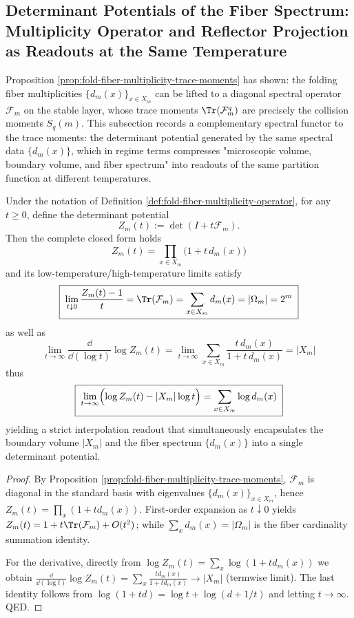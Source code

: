 
\subsection{Determinant Potentials of the Fiber Spectrum: Multiplicity Operator and Reflector Projection as Readouts at the Same Temperature}\label{subsec:op-algebra-fiber-determinant-potentials}
Proposition \ref{prop:fold-fiber-multiplicity-trace-moments} has shown: the folding fiber multiplicities \(\{d_m(x)\}_{x\in X_m}\) can be lifted to a diagonal spectral operator \(\mathcal{F}_m\) on the stable layer, whose trace moments \(\Tr(\mathcal{F}_m^q)\) are precisely the collision moments \(S_q(m)\).
This subsection records a complementary spectral functor to the trace moments: the determinant potential generated by the same spectral data \(\{d_m(x)\}\), which in regime terms compresses "microscopic volume, boundary volume, and fiber spectrum" into readouts of the same partition function at different temperatures.

\begin{proposition}[Fiber Spectrum Partition Function: Closed Form and Two-Endpoint Readout of \texorpdfstring{$Z_m(t)=\det(I+t\mathcal{F}_m)$}{Zm(t)=det(I+tF)}]\label{prop:op-algebra-fiber-spectrum-determinant-partition}
Under the notation of Definition \ref{def:fold-fiber-multiplicity-operator}, for any \(t\ge 0\), define the determinant potential
\[
Z_m(t):=\det(I+t\mathcal{F}_m).
\]
Then the complete closed form holds
\[
\boxed{\;
Z_m(t)=\prod_{x\in X_m}\bigl(1+t\,d_m(x)\bigr)\;}
\]
and its low-temperature/high-temperature limits satisfy
\[
\boxed{\;
\lim_{t\downarrow 0}\frac{Z_m(t)-1}{t}=\Tr(\mathcal{F}_m)=\sum_{x\in X_m}d_m(x)=|\Omega_m|=2^m\;}
\]
as well as
\[
\boxed{\;
\lim_{t\to\infty}\frac{\dd}{\dd(\log t)}\log Z_m(t)
=\lim_{t\to\infty}\sum_{x\in X_m}\frac{t\,d_m(x)}{1+t\,d_m(x)}
=|X_m|\;}
\]
thus
\[
\boxed{\;
\lim_{t\to\infty}\Bigl(\log Z_m(t)-|X_m|\log t\Bigr)=\sum_{x\in X_m}\log d_m(x)\;}
\]
yielding a strict interpolation readout that simultaneously encapsulates the boundary volume \(|X_m|\) and the fiber spectrum \(\{d_m(x)\}\) into a single determinant potential.
\end{proposition}
\begin{proof}
By Proposition \ref{prop:fold-fiber-multiplicity-trace-moments}, \(\mathcal{F}_m\) is diagonal in the standard basis with eigenvalues \(\{d_m(x)\}_{x\in X_m}\), hence
\(
Z_m(t)=\prod_x(1+t d_m(x))
\).
First-order expansion as \(t\downarrow 0\) yields
\(
Z_m(t)=1+t\Tr(\mathcal{F}_m)+O(t^2)
\);
while \(\sum_x d_m(x)=|\Omega_m|\) is the fiber cardinality summation identity.
\par
For the derivative, directly from
\(
\log Z_m(t)=\sum_x \log(1+t d_m(x))
\)
we obtain
\(
\frac{\dd}{\dd(\log t)}\log Z_m(t)=\sum_x \frac{t d_m(x)}{1+t d_m(x)}
\to |X_m|
\) (termwise limit).
The last identity follows from \(\log(1+t d)=\log t+\log(d+1/t)\) and letting \(t\to\infty\). QED.
\end{proof}

